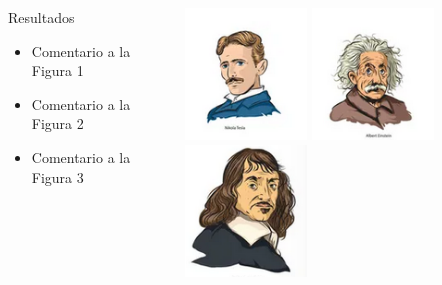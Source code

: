 \documentclass{beamer}
\begin{document}

  \begin{frame}
  \begin{columns}
    \begin{block}{Resultados}
      \begin{itemize}
      \item<1-> Comentario a la Figura 1
      \item<2-> Comentario a la Figura 2
      \item<3-> Comentario a la Figura 3
      \end{itemize}
    \end{block}

    \begin{center}
       {\includegraphics[height=3.5cm]{p1.png}}%
       {\includegraphics[height=3.5cm]{p2.png}}%
       {\includegraphics[height=3.5cm]{p3.png}}%
    \end{center}
  \end{columns}
  \end{frame}

\end{document}
